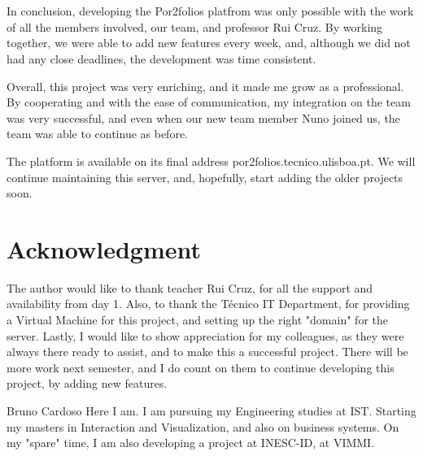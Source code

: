 \documentclass[a4paper,12pt,journal,twoside,compsoc]{PPIEEEtran}
\begin{document}
\section{}
In conclusion, developing the Por2folios platfrom was only possible with the work of all the members involved, our team, and professor Rui Cruz. By working together, we were able to add new features every week, and, although we did not had any close deadlines, the development was time consistent.

Overall, this project was very enriching, and it made me grow as a professional. By cooperating and with the ease of communication, my integration on the team was very successful, and even when our new team member Nuno joined us, the team was able to continue as before.

The platform is available on its final address por2folios.tecnico.ulisboa.pt.
We will continue maintaining this server, and, hopefully, start adding the older projects soon.

\ifCLASSOPTIONcompsoc
  \section*{} %
\else
  \section*{Acknowledgment}
\fi

The author would like to thank teacher Rui Cruz, for all the support and availability from day 1. Also, to thank the Técnico IT Department, for providing a Virtual Machine for this project, and setting up the right "domain" for the server.
Lastly, I would like to show appreciation for my colleagues, as they were always there ready to assist, and to make this a successful project.
There will be more work next semester, and I do count on them to continue developing this project, by adding new features.

% 
\begin{IEEEbiography}{Bruno Cardoso}
Here I am. I am pursuing my Engineering studies at \ac{IST}. Starting my masters in Interaction and Visualization, and also on business systems. On my "spare" time, I am also developing a project at INESC-ID, at VIMMI.
\end{IEEEbiography}
\end{document}
